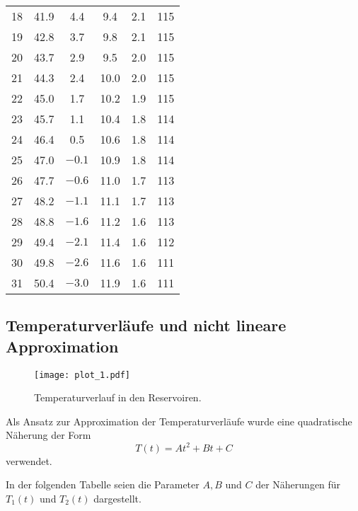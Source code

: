 \begin{table}[H]
\begin{tabular}{S[table-format=2.0] S S S S S[table-format=3.0]}
    18 & {41.9} & { 4.4} &   { 9.4} & {2.1} & {115} \\
    19 & {42.8} & { 3.7} &   { 9.8} & {2.1} & {115} \\
    20 & {43.7} & { 2.9} &   { 9.5} & {2.0} & {115} \\
    21 & {44.3} & { 2.4} &   {10.0} & {2.0} & {115} \\
    22 & {45.0} & { 1.7} &   {10.2} & {1.9} & {115} \\
    23 & {45.7} & { 1.1} &   {10.4} & {1.8} & {114} \\
    24 & {46.4} & { 0.5} &   {10.6} & {1.8} & {114} \\
    25 & {47.0} & {$-0.1$} & {10.9} & {1.8} & {114} \\
    26 & {47.7} & {$-0.6$} & {11.0} & {1.7} & {113} \\
    27 & {48.2} & {$-1.1$} & {11.1} & {1.7} & {113} \\
    28 & {48.8} & {$-1.6$} & {11.2} & {1.6} & {113} \\
    29 & {49.4} & {$-2.1$} & {11.4} & {1.6} & {112} \\
    30 & {49.8} & {$-2.6$} & {11.6} & {1.6} & {111} \\
    31 & {50.4} & {$-3.0$} & {11.9} & {1.6} & {111} \\
    \bottomrule
  \end{tabular}
\end{table}

\subsection{Temperaturverläufe und nicht lineare Approximation}

\begin{figure}[H]
  \centering
  \texttt{[image: plot\_1.pdf]}
  \caption{Temperaturverlauf in den Reservoiren.}
  \label{fig:plot1}
\end{figure}

Als Ansatz zur Approximation der Temperaturverläufe wurde eine quadratische Näherung der Form 
\begin{equation}
  T(t)=At^2+Bt+C
\end{equation}
verwendet.

In der folgenden Tabelle seien die Parameter $A, B$ und $C$ der Näherungen für $T_1(t)$ und $T_2(t)$ dargestellt.

